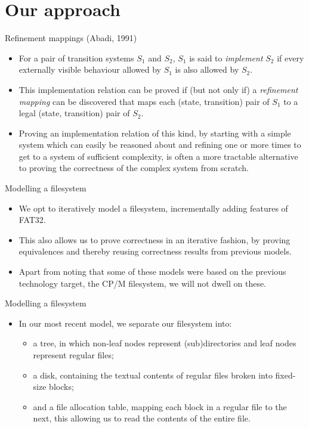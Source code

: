 \documentclass{beamer}
\begin{document}
\section{Our approach}

\begin{frame}{Refinement mappings (Abadi, 1991)}
  \begin{itemize}
  \item For a pair of transition systems $S_1$ and $S_2$, $S_1$ is said to
    \textit{implement} $S_2$ if every externally visible
    behaviour allowed by $S_1$ is also allowed by $S_2$.
  \item This implementation relation can be proved if (but not only
    if) a \textit{refinement mapping} can be discovered that maps
    each (state, transition) pair of $S_1$ to a legal (state,
    transition) pair of $S_2$.
  \item Proving an implementation relation of this kind, by starting
    with a simple system which can easily be reasoned about and
    refining one or more times to get to a system of sufficient
    complexity, is often a more tractable alternative to proving the
    correctness of the complex system from scratch.
  \end{itemize}
\end{frame}

\begin{frame}{Modelling a filesystem}
  \begin{itemize}
  \item We opt to iteratively model a filesystem, incrementally
    adding features of FAT32.
  \item This also allows us to prove correctness in an iterative
    fashion, by proving equivalences and thereby reusing correctness
    results from previous models.
  \item Apart from noting that some of these models were based on
    the previous technology target, the CP/M filesystem, we will not
    dwell on these.
  \end{itemize}
\end{frame}

\begin{frame}{Modelling a filesystem}
  \begin{itemize}
  \item In our most recent model, we separate our filesystem into:
    \begin{itemize}
    \item a tree, in which non-leaf nodes represent (sub)directories
      and leaf nodes represent regular files;
    \item a disk, containing the textual contents of regular files
      broken into fixed-size blocks;
    \item and a file allocation table, mapping each block in a regular
      file to the next, this allowing us to read the contents of the
      entire file.
    \end{itemize}
  \end{itemize}
\end{frame}
\end{document}
